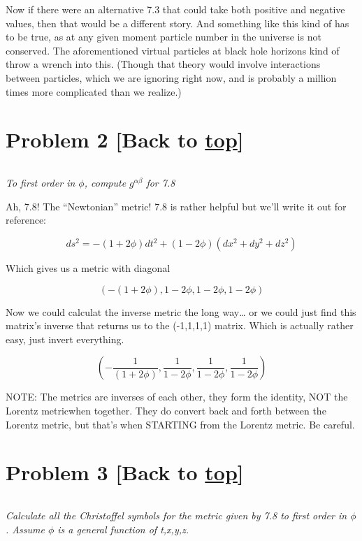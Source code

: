 \documentclass[landscape,letterpaper,10pt,english]{article}
\begin{document}
Now if there were an alternative 7.3 that could take both positive and
negative values, then that would be a different story. And something
like this kind of has to be true, as at any given moment particle number
in the universe is not conserved. The aforementioned virtual particles
at black hole horizons kind of throw a wrench into this. (Though that
theory would involve interactions between particles, which we are
ignoring right now, and is probably a million times more complicated
than we realize.)

    \hypertarget{problem-2-back-to-top}{%
\section{\texorpdfstring{Problem 2 {[}Back to
\hyperref[toc]{top}{]}}{Problem 2 {[}Back to {]}}}\label{problem-2-back-to-top}}

\[\label{P2}\]

\emph{To first order in \(\phi\), compute \(g^{\alpha\beta}\) for 7.8}

    Ah, 7.8! The ``Newtonian'' metric! 7.8 is rather helpful but we'll write
it out for reference:

\[ ds^2 = -(1+2\phi)dt^2 + (1-2\phi)(dx^2+dy^2+dz^2)  \]

Which gives us a metric with diagonal

\[(-(1+2\phi),1-2\phi,1-2\phi,1-2\phi)\]

Now we could calculat the inverse metric the long way\ldots{} or we
could just find this matrix's inverse that returns us to the (-1,1,1,1)
matrix. Which is actually rather easy, just invert everything.

\[(-\frac{1}{(1+2\phi)},\frac{1}{1-2\phi},\frac{1}{1-2\phi},\frac{1}{1-2\phi})\]

NOTE: The metrics are inverses of each other, they form the identity,
NOT the Lorentz metricwhen together. They do convert back and forth
between the Lorentz metric, but that's when STARTING from the Lorentz
metric. Be careful.

    \hypertarget{problem-3-back-to-top}{%
\section{\texorpdfstring{Problem 3 {[}Back to
\hyperref[toc]{top}{]}}{Problem 3 {[}Back to {]}}}\label{problem-3-back-to-top}}

\[\label{P3}\]

\emph{Calculate all the Christoffel symbols for the metric given by 7.8
to first order in \(\phi\). Assume \(\phi\) is a general function of
t,x,y,z.}
\end{document}
